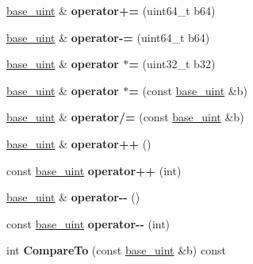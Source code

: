 \begin{DoxyCompactItemize}
\mbox{\hyperlink{classbase__uint}{base\+\_\+uint}} \& {\bfseries operator+=} (uint64\+\_\+t b64)
\item 
\mbox{\label{classbase__uint_ab64f7a7a87b9af5ea345e4678b4cc1e9}} 
\mbox{\hyperlink{classbase__uint}{base\+\_\+uint}} \& {\bfseries operator-\/=} (uint64\+\_\+t b64)
\item 
\mbox{\label{classbase__uint_ae4f00f04d1f0d63161d3e5ca2568c5de}} 
\mbox{\hyperlink{classbase__uint}{base\+\_\+uint}} \& {\bfseries operator $\ast$=} (uint32\+\_\+t b32)
\item 
\mbox{\label{classbase__uint_a056f9b64c2cec22495a232503b4de2d2}} 
\mbox{\hyperlink{classbase__uint}{base\+\_\+uint}} \& {\bfseries operator $\ast$=} (const \mbox{\hyperlink{classbase__uint}{base\+\_\+uint}} \&b)
\item 
\mbox{\label{classbase__uint_a81e131ae767e0e606c0748d69d04316e}} 
\mbox{\hyperlink{classbase__uint}{base\+\_\+uint}} \& {\bfseries operator/=} (const \mbox{\hyperlink{classbase__uint}{base\+\_\+uint}} \&b)
\item 
\mbox{\label{classbase__uint_a56b54869886808961092d3f764fadd9f}} 
\mbox{\hyperlink{classbase__uint}{base\+\_\+uint}} \& {\bfseries operator++} ()
\item 
\mbox{\label{classbase__uint_a2d5a123c856b2b31fae5f65891832486}} 
const \mbox{\hyperlink{classbase__uint}{base\+\_\+uint}} {\bfseries operator++} (int)
\item 
\mbox{\label{classbase__uint_a2cc581d32afac619acd12601ddea4180}} 
\mbox{\hyperlink{classbase__uint}{base\+\_\+uint}} \& {\bfseries operator-\/-\/} ()
\item 
\mbox{\label{classbase__uint_a78a8e46c434c0e61be86282fe9543587}} 
const \mbox{\hyperlink{classbase__uint}{base\+\_\+uint}} {\bfseries operator-\/-\/} (int)
\item 
\mbox{\label{classbase__uint_a1196e0ff823836958e45aec3a246b9d2}} 
int {\bfseries Compare\+To} (const \mbox{\hyperlink{classbase__uint}{base\+\_\+uint}} \&b) const

\end{DoxyCompactItemize}
